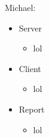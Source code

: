 Michael: 
\begin{itemize}
	\item Server
	\begin{itemize}
		\item lol
	\end{itemize}
	\item Client
	\begin{itemize}
		\item lol
	\end{itemize}
	\item Report
	\begin{itemize}
		\item lol
	\end{itemize}
\end{itemize}